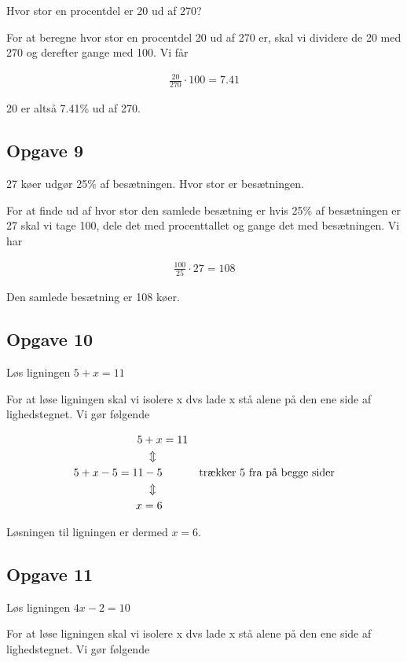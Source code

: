 Hvor stor en procentdel er 20 ud af 270?

For at beregne hvor stor en procentdel 20 ud af 270 er, skal vi dividere de 20 med 270 og derefter gange med 100. Vi får

\begin{align*}
\frac{20}{270}\cdot 100 = 7.41
\end{align*}

20 er altså 7.41\% ud af 270.

\subsection{Opgave 9}
27 køer udgør 25\% af besætningen. Hvor stor er besætningen.

For at finde ud af hvor stor den samlede besætning er hvis 25\% af besætningen er 27 skal vi tage 100, dele det med procenttallet og gange det med besætningen. Vi har

\begin{align*}
\frac{100}{25}\cdot 27 = 108
\end{align*} 

Den samlede besætning er 108 køer.

\subsection{Opgave 10}
Løs ligningen $5+x=11$

For at løse ligningen skal vi isolere x dvs lade x stå alene på den ene side af lighedstegnet. Vi gør følgende

\begin{align*}
5+x &= 11\\
\Updownarrow\hspace*{2mm} &\\
5+x-5 = 11-5 && \text{trækker 5 fra på begge sider}\\
\Updownarrow\hspace*{2mm} &\\
x = 6
\end{align*}

Løsningen til ligningen er dermed $x = 6$.

\subsection{Opgave 11}
Løs ligningen $4x - 2 = 10$

For at løse ligningen skal vi isolere x dvs lade x stå alene på den ene side af lighedstegnet. Vi gør følgende

